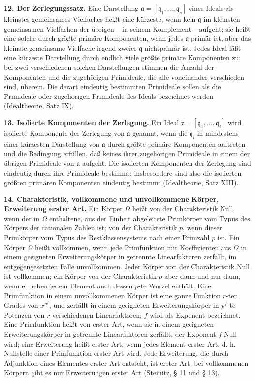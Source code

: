 \documentclass[11pt]{article}
\providecommand{\frakq}{\mathfrak q}
\providecommand{\frakr}{\mathfrak r}
\providecommand{\fraka}{\mathfrak a}
\begin{document}
\textbf{12. Der Zerlegungssatz.} Eine Darstellung $\fraka=[\frakq_1,\ldots,\frakq_s]$ eines Ideals als kleinstes gemeinsames Vielfaches heißt eine kürzeste, wenn kein $\frakq$ im kleinsten gemeinsamen Vielfachen der übrigen -- in seinem Komplement -- aufgeht; sie heißt eine solche durch größte primäre Komponenten, wenn jedes $\frakq$ primär ist, aber das kleinste gemeinsame Vielfache irgend zweier $\frakq$ nichtprimär ist. Jedes Ideal läßt eine kürzeste Darstellung durch endlich viele größte primäre Komponenten zu; bei zwei verschiedenen solchen Darstellungen stimmen die Anzahl der Komponenten und die zugehörigen Primideale, die alle voneinander verschieden sind, überein. Die derart eindeutig bestimmten Primideale sollen als die Primideale oder zugehörigen Primideale des Ideals bezeichnet werden (Idealtheorie, Satz IX).

\textbf{13. Isolierte Komponenten der Zerlegung.} Ein Ideal $\frakr=[\frakq_1,\ldots,\frakq_i]$ wird isolierte Komponente der Zerlegung von $\fraka$ genannt, wenn die $\frakq_i$ in mindestens einer kürzesten Darstellung von $\fraka$ durch größte primäre Komponenten auftreten und die Bedingung erfüllen, daß keines ihrer zugehörigen Primideale in einem der übrigen Primideale von $\fraka$ aufgeht. Die isolierten Komponenten der Zerlegung sind eindeutig durch ihre Primideale bestimmt; insbesondere sind also die isolierten größten primären Komponenten eindeutig bestimmt (Idealtheorie, Satz XIII).

\textbf{14. Charakteristik, vollkommene und unvollkommene Körper, Erweiterung erster Art.} Ein Körper $\Omega$ heißt von der Charakteristik Null, wenn der in $\Omega$ enthaltene, aus der Einheit abgeleitete Primkörper vom Typus des Körpers der rationalen Zahlen ist; von der Charakteristik $p$, wenn dieser Primkörper vom Typus des Restklassensystems nach einer Primzahl $p$ ist. Ein Körper $\Omega$ heißt vollkommen, wenn jede Primfunktion mit Koeffizienten aus $\Omega$ in einem geeigneten Erweiterungskörper in getrennte Linearfaktoren zerfällt, im entgegengesetzten Falle unvollkommen. Jeder Körper von der Charakteristik Null ist vollkommen; ein Körper von der Charakteristik $p$ aber dann und nur dann, wenn er neben jedem Element auch dessen $p$-te Wurzel enthält. Eine Primfunktion in einem unvollkommenen Körper ist eine ganze Funktion $r$-ten Grades von $x^{p^f}$, und zerfällt in einem geeigneten Erweiterungskörper in $p^f$-te Potenzen von $r$ verschiedenen Linearfaktoren; $f$ wird als Exponent bezeichnet. Eine Primfunktion heißt von erster Art, wenn sie in einem geeigneten Erweiterungskörper in getrennte Linearfaktoren zerfällt, der Exponent $f$ Null wird; eine Erweiterung heißt erster Art, wenn jedes Element erster Art, d. h. Nullstelle einer Primfunktion erster Art wird. Jede Erweiterung, die durch Adjunktion eines Elementes erster Art entsteht, ist erster Art; bei vollkommenen Körpern gibt es nur Erweiterungen erster Art (Steinitz, § 11 und § 13).
\end{document}
